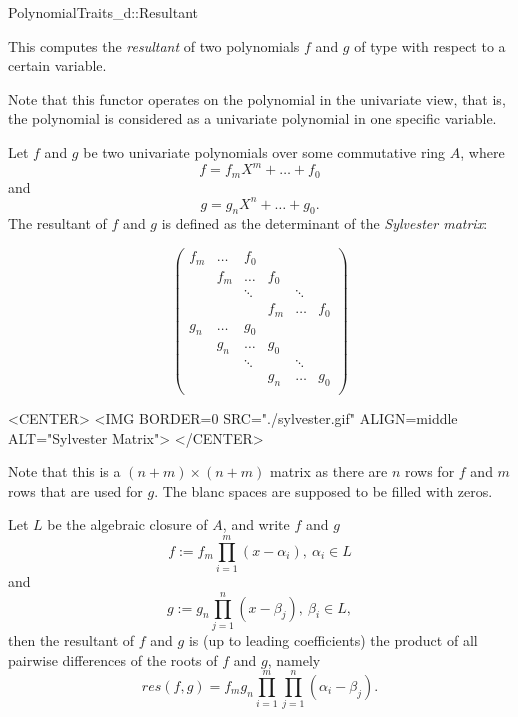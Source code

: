 \begin{ccRefConcept}{PolynomialTraits_d::Resultant}
\ccDefinition

This  computes the {\em resultant} of two polynomials 
$f$ and $g$ of type  with respect to a 
certain variable.
 
Note that this functor operates on the polynomial in the univariate view, 
that is, the polynomial is considered as a univariate polynomial in one 
specific variable. 

Let $f$ and $g$ be two univariate polynomials over some commutative ring $A$, 
where 
\[f = f_mX^m + \dots + f_0\] and 
\[g = g_nX^n + \dots + g_0.\] 
The resultant of $f$ and $g$ is defined as the determinant of the {\em Sylvester matrix}: 

\begin{ccTexOnly}
\[ \left( \begin{array}{cccccccc}
f_m & \dots & f_0&&& \\
&f_m & \dots & f_0&&\\
&&\ddots&&\ddots&\\
&&&f_m &\dots& f_0\\  
g_n & \dots & g_0&&& \\
&g_n & \dots & g_0&&\\
&&\ddots&&\ddots&\\
&&&g_n & \dots& g_0\\  
\end{array} \right) \]
\end{ccTexOnly}

\begin{ccHtmlOnly}
<CENTER>
<IMG BORDER=0 SRC="./sylvester.gif" ALIGN=middle ALT="Sylvester Matrix">
</CENTER>
\end{ccHtmlOnly}

Note that this is a $(n+m)\times(n+m)$ matrix as there are $n$ rows for $f$ 
and $m$ rows that are used for $g$. The blanc spaces are supposed to be 
filled with zeros. 


\begin{ccAdvanced}
Let $L$ be the algebraic closure of $A$, and write $f$ and $g$ 
\[f := f_m \prod_{i=1}^{m}{(x-\alpha_i)},\ \alpha_i \in L \]
and 
\[g :=  g_n \prod_{j=1}^{n}{(x-\beta_j)},\ \beta_i \in L,\] then
the resultant of $f$ and $g$ is (up to leading coefficients) 
the product of all pairwise differences of the roots of $f$ and $g$, namely 
\[res(f,g) = f_m g_n \prod_{i=1}^{m}\prod_{j=1}^{n}{(\alpha_i-\beta_j)}.\] 
\end{ccAdvanced}


\end{ccRefConcept}
